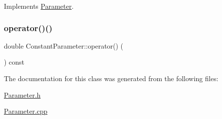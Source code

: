 Implements \hyperlink{class_parameter_ae6317fac3d0b5e69101eb7059d151ca7}{Parameter}.

\hypertarget{class_constant_parameter_a8ce664e975d03c38141462813b360913}{}\label{class_constant_parameter_a8ce664e975d03c38141462813b360913} 
\subsubsection{\texorpdfstring{operator()()}{operator()()}\hspace{0.1cm}{\footnotesize\ttfamily [2/2]}}
{\footnotesize\ttfamily double Constant\+Parameter\+::operator() (\begin{DoxyParamCaption}{ }\end{DoxyParamCaption}) const\hspace{0.3cm}{\ttfamily [inline]}}



The documentation for this class was generated from the following files\+:\begin{DoxyCompactItemize}
\item 
\hyperlink{_parameter_8h}{Parameter.\+h}\item 
\hyperlink{_parameter_8cpp}{Parameter.\+cpp}\end{DoxyCompactItemize}
